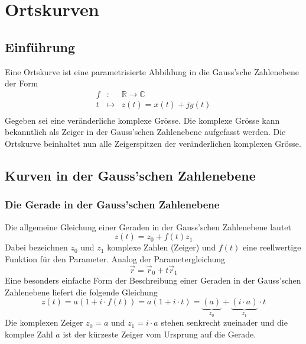 \chapter{Ortskurven}
\section{Einführung}
Eine Ortskurve ist eine parametrisierte Abbildung in die Gauss'sche Zahlenebene der Form
\begin{equation}
\boxed{
\begin{array}{lll}
f&:&\mathbb{R}\rightarrow \mathbb{C}\\
t&\mapsto&z\left(t\right)=x\left(t\right)+jy\left(t\right)\\
\end{array}
}
\end{equation}
Gegeben sei eine veränderliche komplexe Grösse. Die komplexe Grösse kann bekanntlich als Zeiger in der Gauss'schen Zahlenebene aufgefasst werden. Die Ortskurve beinhaltet nun alle Zeigerspitzen der veränderlichen komplexen Grösse.
\section{Kurven in der Gauss'schen Zahlenebene}
\subsection{Die Gerade in der Gauss'schen Zahlenebene}
Die allgemeine Gleichung einer Geraden in der Gauss'schen Zahlenebene lautet
\begin{equation}
\boxed{z\left(t\right)=z_0+f\left(t\right)z_1}
\end{equation}
Dabei bezeichnen $z_0$ und $z_1$ komplexe Zahlen (Zeiger) und $f\left(t\right)$ eine reellwertige Funktion für den Parameter. Analog der Parametergleichung
\begin{equation}
\boxed{\overrightarrow{r}=\overrightarrow{r}_0+t\overrightarrow{r}_1}
\end{equation}
Eine besonders einfache Form der Beschreibung einer Geraden in der Gauss'schen Zahlenebene liefert die folgende Gleichung
\begin{equation}
\boxed{z\left(t\right)=a\left(1+i\cdot f\left(t\right)\right)=a\left(1+i\cdot t\right)=\underbrace{\left(a\right)}_{z_0}+\underbrace{\left(i\cdot a\right)}_{z_1}\cdot t}
\end{equation}
Die komplexen Zeiger $z_0=a$ und $z_1=i\cdot a$ stehen senkrecht zueinader und die komplee Zahl $a$ ist der kürzeste Zeiger vom Ursprung auf die Gerade.
